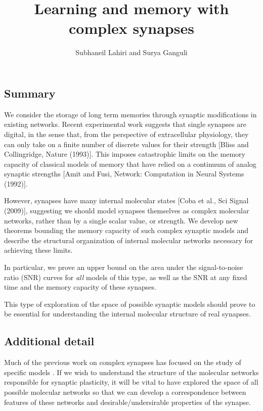 \documentclass[12pt]{article}
\title{Learning and memory with complex synapses}
\author{Subhaneil Lahiri and Surya Ganguli}
\date{}
\begin{document}
\maketitle



\subsection*{Summary}

We consider the storage of long term memories through synaptic modifications in existing networks.
Recent experimental work suggests that single synapses are digital, in the sense that, from the perspective of extracellular physiology, they can only take on a finite number of discrete values for their strength [Bliss and Collingridge, Nature (1993)]\nocite{Bliss1993}.
This imposes catastrophic limits on the memory capacity of classical models of memory that have relied on a continuum of analog synaptic strengths [Amit and Fusi, Network: Computation in Neural Systems (1992)]\nocite{amit1992constraints}.

However, synapses have many internal molecular states [Coba et al., Sci Signal (2009)]\nocite{Coba2009phosphorylation}, suggesting we should model synapses themselves as complex molecular networks, rather than by a single scalar value, or strength.
We develop new theorems bounding the memory capacity of such complex synaptic models and describe the structural organization of internal molecular networks necessary for achieving these limits.

In particular, we prove an upper bound on the area under the signal-to-noise ratio (SNR) curves for \emph{all} models of this type, as well as the SNR at any fixed time and the memory capacity of these synapses.

This type of exploration of the space of possible synaptic models should prove to be essential for understanding the internal molecular structure of real synapses.

\subsection*{Additional detail}

Much of the previous work on complex synapses has focused on the study of specific models \cite{amit1994learning,*Fusi2005cascade}.
If we wish to understand the structure of the molecular networks responsible for synaptic plasticity, it will be vital to have explored the space of all possible molecular networks so that we can develop a correspondence between features of these networks and desirable/undersirable properties of the synapse.
\end{document}
